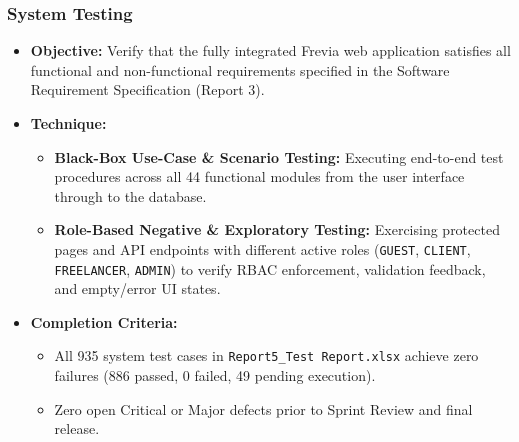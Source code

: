 \documentclass[12pt,a4paper]{article}
\begin{document}
\subsubsection{System Testing}
\begin{itemize}
  \item \textbf{Objective:} Verify that the fully integrated Frevia web application satisfies all functional and non-functional requirements specified in the Software Requirement Specification (Report 3).
  \item \textbf{Technique:}
  \begin{itemize}
    \item \textbf{Black-Box Use-Case \& Scenario Testing:} Executing end-to-end test procedures across all 44 functional modules from the user interface through to the database.
    \item \textbf{Role-Based Negative \& Exploratory Testing:} Exercising protected pages and API endpoints with different active roles (\texttt{GUEST}, \texttt{CLIENT}, \texttt{FREELANCER}, \texttt{ADMIN}) to verify RBAC enforcement, validation feedback, and empty/error UI states.
  \end{itemize}
  \item \textbf{Completion Criteria:}
  \begin{itemize}
    \item All 935 system test cases in \texttt{Report5\_Test Report.xlsx} achieve zero failures (886 passed, 0 failed, 49 pending execution).
    \item Zero open Critical or Major defects prior to Sprint Review and final release.
  \end{itemize}
\end{itemize}
\end{document}
